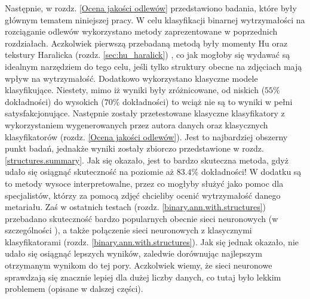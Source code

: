 Następnie, w rozdz. \ref{Ocena jakości odlewów} przedstawiono badania, które były głównym tematem niniejszej pracy. W celu klasyfikacji binarnej wytrzymałości na rozciąganie odlewów wykorzystano metody zaprezentowane w poprzednich rozdziałach. Aczkolwiek pierwszą przebadaną metodą były momenty Hu oraz tekstury Haralicka (rozdz. \ref{sec:hu_haralick}) , co jak mogłoby się wydawać są idealnym narzędziem do tego celu, jeśli tylko struktury obecne na zdjęciach mają wpływ na wytrzymałość. Dodatkowo wykorzystano klasyczne modele klasyfikujące. Niestety, mimo iż wyniki były zróżnicowane, od niskich ($55\%$ dokładności) do wysokich ($70\%$ dokładności) to wciąż nie są to wyniki w pełni satysfakcjonujące. Następnie zostały przetestowane klasyczne klasyfikatory z wykorzystaniem wygenerowanych przez autora danych oraz klasycznych klasyfikatorów (rozdz. \ref{Ocena jakości odlewów}). Jest to najbardziej obszerny punkt badań, jednakże wyniki zostały zbiorczo przedstawione w rozdz. \ref{structures.summary}. Jak się okazało, jest to bardzo skuteczna metoda, gdyż udało się osiągnąć skuteczność na poziomie aż $83.4\%$ dokładności! W dodatku są to metody wysoce interpretowalne, przez co mogłyby służyć jako pomoc dla specjalistów, którzy za pomocą zdjęć chcieliby ocenić wytrzymałość danego metariału. Zaś w ostatnich testach (rozdz. \ref{binary.ann.with.structures}) przebadano skuteczność bardzo popularnych obecnie sieci neuronowych (w szczególności ), a także połączenie sieci neuronowych z klasycznymi klasyfikatorami (rozdz. \ref{binary.ann.with.structures}). Jak się jednak okazało, nie udało się osiągnąć lepszych wyników, zaledwie dorównując najlepszym otrzymanym wynikom do tej pory. Aczkolwiek wiemy, że sieci neuronowe sprawdzają się znacznie lepiej dla dużej liczby danych, co tutaj było lekkim problemem (opisane w dalszej części).

